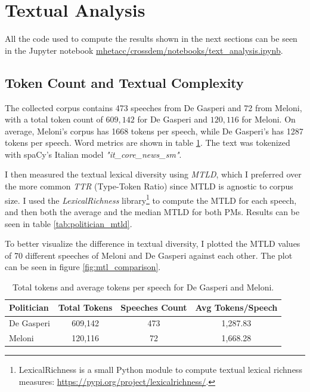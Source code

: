 \section{Textual Analysis}

All the code used to compute the results shown in the next sections can be seen in the Jupyter notebook \href{https://github.com/mhetacc/crossdem/blob/8645cc832df6ead9163506777cc995e2d70f5bd1/notebooks/text_analysis.ipynb}{mhetacc/crossdem/notebooks/text\_analysis.ipynb}.


\subsection{Token Count and Textual Complexity}

The collected corpus contains 473 speeches from De Gasperi and 72 from Meloni, with a total token count of $609,142$ for De Gasperi and $120,116$ for Meloni.
On average, Meloni's corpus has 1668 tokens per speech, while De Gasperi's has 1287 tokens per speech. Word metrics are shown in table \ref{tab:politician_tokens}.
The text was tokenized with spaCy's Italian model \textit{"it\_core\_news\_sm"}.

I then measured the textual lexical diversity using \textit{MTLD}, which I preferred over the more common \textit{TTR} (Type-Token Ratio) since MTLD is agnostic to corpus size. I used the \textit{LexicalRichness} library\footnote{LexicalRichness is a small Python module to compute textual lexical richness measures: \url{https://pypi.org/project/lexicalrichness/}.} to compute the MTLD for each speech, and then both the average and the median MTLD for both PMs. Results can be seen in table \ref{tab:politician_mtld}.

To better visualize the difference in textual diversity, I plotted the MTLD values of 70 different speeches of Meloni and De Gasperi against each other. The plot can be seen in figure \ref{fig:mtl_comparison}.


\begin{table}[h]
    \centering
    \caption{Total tokens and average tokens per speech for De Gasperi and Meloni.}
    \label{tab:politician_tokens}
    \begin{tabular}{lccc}
        \toprule
        \textbf{Politician} & \textbf{Total Tokens} & \textbf{Speeches Count} & \textbf{Avg Tokens/Speech} \\
        \midrule
        De Gasperi           & 609,142               & 473                   & 1,287.83                   \\
        Meloni              & 120,116               & 72                    & 1,668.28                   \\
        \bottomrule
    \end{tabular}
\end{table}


